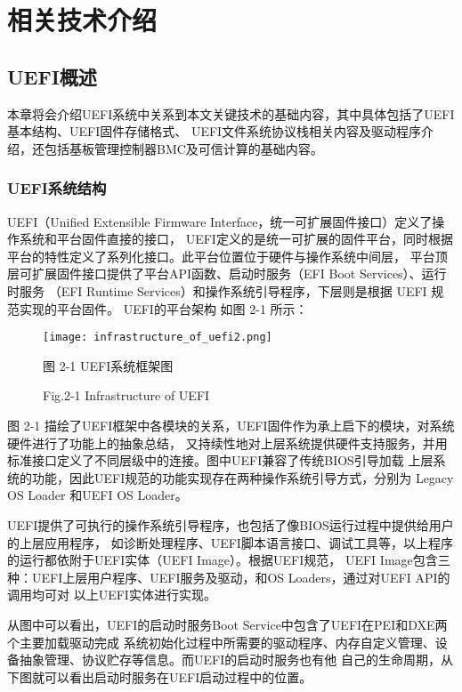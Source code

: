 %
%
\chapter{相关技术介绍}

%
%
\section{UEFI概述}
本章将会介绍UEFI系统中关系到本文关键技术的基础内容，其中具体包括了UEFI基本结构、UEFI固件存储格式、
UEFI文件系统协议栈相关内容及驱动程序介绍，还包括基板管理控制器BMC及可信计算的基础内容。

\subsection{UEFI系统结构}
UEFI（Unified Extensible Firmware Interface，统一可扩展固件接口）定义了操作系统和平台固件直接的接口，
UEFI定义的是统一可扩展的固件平台，同时根据平台的特性定义了系列化接口。此平台位置位于硬件与操作系统中间层，
平台顶层可扩展固件接口提供了平台API函数、启动时服务（EFI  Boot  Services）、运行时服务
（EFI  Runtime Services）和操作系统引导程序\cite{english21}，下层则是根据 UEFI 规范实现的平台固件。
UEFI的平台架构
如图 2-1 所示：

\begin{figure}[htb]
    \vspace{0cm}
    \setlength{\abovecaptionskip}{0.3cm}
	\centering
    \texttt{[image: infrastructure\_of\_uefi2.png]}
    \caption*{图 2-1 UEFI系统框架图}
    \setlength{\belowcaptionskip}{-0.7cm}
    \caption*{Fig.2-1 Infrastructure of UEFI}
\end{figure}

\par 图 2-1 描绘了UEFI框架中各模块的关系，UEFI固件作为承上启下的模块，对系统硬件进行了功能上的抽象总结，
又持续性地对上层系统提供硬件支持服务，并用标准接口定义了不同层级中的连接。图中UEFI兼容了传统BIOS引导加载
上层系统的功能，因此UEFI规范的功能实现存在两种操作系统引导方式，分别为
Legacy OS Loader 和UEFI OS Loader。 
\par UEFI提供了可执行的操作系统引导程序，也包括了像BIOS运行过程中提供给用户的上层应用程序，
如诊断处理程序、UEFI脚本语言接口、调试工具等，以上程序的运行都依附于UEFI实体（UEFI Image）。根据UEFI规范，
UEFI Image包含三种：UEFI上层用户程序、UEFI服务及驱动，和OS Loaders，通过对UEFI API的调用均可对
以上UEFI实体进行实现。
\par 从图中可以看出，UEFI的启动时服务Boot Service中包含了UEFI在PEI和DXE两个主要加载驱动完成
系统初始化过程中所需要的驱动程序、内存自定义管理、设备抽象管理、协议贮存等信息。而UEFI的启动时服务也有他
自己的生命周期，从下图就可以看出启动时服务在UEFI启动过程中的位置。

